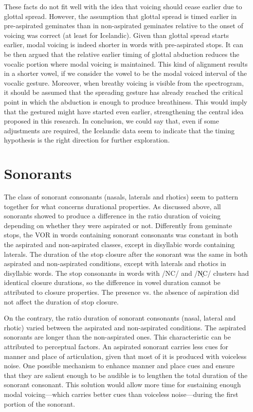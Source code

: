 \documentclass[11pt,a4paper,openany]{memoir}\usepackage[]{graphicx}\usepackage[]{color}
\begin{document}
These facts do not fit well with the idea that voicing should cease earlier due to glottal spread.
However, the assumption that glottal spread is timed earlier in pre-aspirated geminates than in non-aspirated geminates relative to the onset of voicing was correct (at least for Icelandic).
Given than glottal spread starts earlier, modal voicing is indeed shorter in words with pre-aspirated stops.
It can be then argued that the relative earlier timing of glottal abduction reduces the vocalic portion where modal voicing is maintained.
This kind of alignment results in a shorter vowel, if we consider the vowel to be the modal voiced interval of the vocalic gesture.
Moreover, when breathy voicing is visible from the spectrogram, it should be assumed that the spreading gesture has already reached the critical point in which the abduction is enough to produce breathiness.
This would imply that the gestured might have started even earlier, strengthening the central idea proposed in this research.
In conclusion, we could say that, even if some adjustments are required, the Icelandic data seem to indicate that the timing hypothesis is the right direction for further exploration.


\section{Sonorants}

The class of sonorant consonants (nasals, laterals and rhotics) seem to pattern together for what concerns durational properties.
As discussed above, all sonorants showed to produce a difference in the ratio duration of voicing depending on whether they were aspirated or not.
Differently from geminate stops, the VOR in words containing sonorant consonants was constant in both the aspirated and non-aspirated classes, except in disyllabic words containing laterals.
The duration of the stop closure after the sonorant was the same in both aspirated and non-aspirated conditions, except with laterals and rhotics in disyllabic words.
The stop consonants in words with /NC/ and /N̥C/ clusters had identical closure durations, so the difference in vowel duration cannot be attributed to closure properties.
The presence vs. the absence of aspiration did not affect the duration of stop closure.

On the contrary, the ratio duration of sonorant consonants (nasal, lateral and rhotic) varied between the aspirated and non-aspirated conditions.
The aspirated sonorants are longer than the non-aspirated ones.
This characteristic can be attributed to perceptual factors.
An aspirated sonorant carries less cues for manner and place of articulation, given that most of it is produced with voiceless noise.
One possible mechanism to enhance manner and place cues and ensure that they are salient enough to be audible is to lengthen the total duration of the sonorant consonant.
This solution would allow more time for sustaining enough modal voicing---which carries better cues than voiceless noise---during the first portion of the sonorant.
\end{document}
